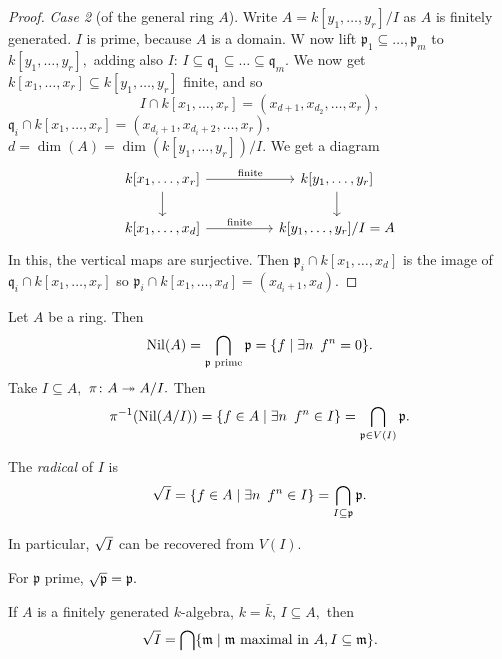 \begin{proof}
  \emph{Case 2} (of the general ring \(A\)).
  Write
  \(A = k[y_1, \dotsc, y_r]/{I}\)
  as \(A\) is finitely generated.
  \(I\) is prime, because \(A\) is a domain.
  W now lift
  \(\mathfrak p_1 \subseteq \dotsc, \mathfrak p_m\)
  to \(k[y_1, \dotsc, y_r],\) adding also \(I\):
  \(I \subseteq \mathfrak q_1 \subseteq \dotso \subseteq \mathfrak q_m.\)
  We now get
  \(k[x_1, \dotsc, x_r] \subseteq k[y_1, \dotsc, y_r]\) finite, and so
  \[I \cap k[x_1, \dotsc, x_r] = (x_{d+1}, x_{d_2}, \dotsc, x_r),\]
  \(\mathfrak q_i \cap k[x_1, \dotsc, x_r] = (x_{d_i+1}, x_{d_i+2}, \dotsc, x_r),\)
  \(d = \dim(A) = \dim(k[y_1, \dotsc, y_r])/{I}.\)
  We get a diagram
  \begin{equation*}
    \begin{tikzcd}[column sep = huge]
      k[x_1, \dotsc, x_r] \arrow{r}{\text{finite}} \arrow{d}
      & k[y_1, \dotsc, y_r] \arrow{d} \\
      k[x_1, \dotsc, x_d] \arrow{r}{\text{finite}}
      & k[y_1, \dotsc, y_r]/{I} = A
    \end{tikzcd}
  \end{equation*}
  In this, the vertical maps are surjective.
  Then
  \(\mathfrak p_i \cap k[x_1, \dotsc, x_d]\) is the image of \(\mathfrak q_i \cap k[x_1, \dotsc, x_r]\)
  so
  \(\mathfrak p_i \cap k[x_1, \dotsc, x_d] = (x_{d_i+1}, x_{d}).\)
\end{proof}


\begin{note}
  Let \(A\) be a ring. Then
  \[\operatorname{Nil}(A) = \bigcap_{\mathfrak p \text{ prime}} \mathfrak p = \{f \mathrel{|} \exists n \enspace f^n = 0\}.\]
  Take \(I \subseteq A,\) \(\pi \colon A \twoheadrightarrow A/{I}.\)
  Then
  \[\pi^{-1}(\operatorname{Nil}(A/{I})) = \{f \in A \mathrel{|} \exists n \enspace f^n \in I\} = \bigcap_{\mathfrak p \in V(I)} \mathfrak p.\]
\end{note}

\begin{df}
The \emph{radical} of \(I\) is
\[\sqrt{I} = \{f \in A \mathrel{|} \exists n \enspace f^n \in I\} = \bigcap_{I \subseteq \mathfrak p} \mathfrak p.\]
\end{df}
In particular, \(\sqrt{I}\) can be recovered from \(V(I).\)

\begin{prop}
  For \(\mathfrak p\) prime, \(\sqrt{\mathfrak p} = \mathfrak p.\)
\end{prop}

\begin{theorem}[Nullstellensatz]
  \label{Nullstellensatz}
  If \(A\) is a finitely generated \(k\)-algebra, \(k = \bar k\), \(I \subseteq A,\) then
  \[\sqrt{I} = \bigcap \{\mathfrak m \mathrel{|} \mathfrak m \text{ maximal in \(A\)}, I \subseteq \mathfrak{ m}\}.\]
\end{theorem}

